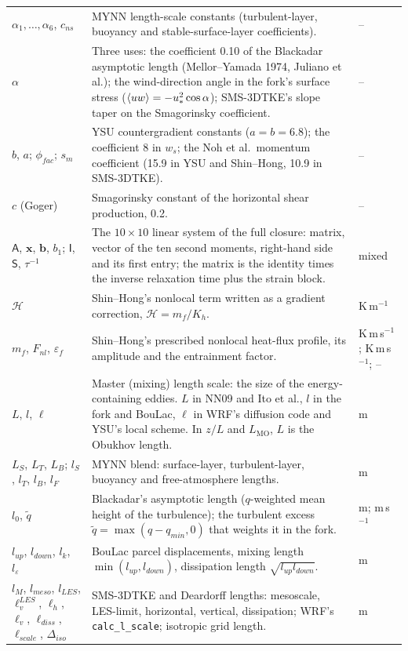 \begin{xltabular}{\linewidth}{@{}>{\raggedright\arraybackslash}p{3.6cm} >{\raggedright\arraybackslash}X >{\raggedright\arraybackslash}p{2.3cm}@{}}
$\alpha_1, \ldots, \alpha_6$, $c_{ns}$ & MYNN length-scale constants (turbulent-layer, buoyancy and stable-surface-layer coefficients). & -- \\
$\alpha$ & Three uses: the coefficient 0.10 of the Blackadar asymptotic length (Mellor--Yamada 1974, Juliano et al.); the wind-direction angle in the fork's surface stress ($\langle uw \rangle = -u_*^2\cos\alpha$); SMS-3DTKE's slope taper on the Smagorinsky coefficient. & -- \\
$b$, $a$; $\phi_{fac}$; $s_m$ & YSU countergradient constants ($a = b = 6.8$); the coefficient 8 in $w_s$; the Noh et al.\ momentum coefficient (15.9 in YSU and Shin--Hong, 10.9 in SMS-3DTKE). & -- \\
$c$ (Goger) & Smagorinsky constant of the horizontal shear production, 0.2. & -- \\
$\mathsf{A}$, $\mathbf{x}$, $\mathbf{b}$, $b_1$; $\mathsf{I}$, $\mathsf{S}$, $\tau^{-1}$ & The $10 \times 10$ linear system of the full closure: matrix, vector of the ten second moments, right-hand side and its first entry; the matrix is the identity times the inverse relaxation time plus the strain block. & mixed \\
$\mathcal{H}$ & Shin--Hong's nonlocal term written as a gradient correction, $\mathcal{H} = m_f/K_h$. & K\,m$^{-1}$ \\
$m_f$, $F_{nl}$, $\varepsilon_f$ & Shin--Hong's prescribed nonlocal heat-flux profile, its amplitude and the entrainment factor. & K\,m\,s$^{-1}$; K\,m\,s$^{-1}$; -- \\
$L$, $l$, $\ell$ & Master (mixing) length scale: the size of the energy-containing eddies. $L$ in NN09 and Ito et al., $l$ in the fork and BouLac, $\ell$ in WRF's diffusion code and YSU's local scheme. In $z/L$ and $L_{\mathrm{MO}}$, $L$ is the Obukhov length. & m \\
$L_S$, $L_T$, $L_B$; $l_S$, $l_T$, $l_B$, $l_F$ & MYNN blend: surface-layer, turbulent-layer, buoyancy and free-atmosphere lengths. & m \\
$l_0$, $\tilde q$ & Blackadar's asymptotic length ($q$-weighted mean height of the turbulence); the turbulent excess $\tilde q = \max(q - q_{min}, 0)$ that weights it in the fork. & m; m\,s$^{-1}$ \\
$l_{up}$, $l_{down}$, $l_k$, $l_\varepsilon$ & BouLac parcel displacements, mixing length $\min(l_{up}, l_{down})$, dissipation length $\sqrt{l_{up}l_{down}}$. & m \\
$l_M$, $l_{meso}$, $l_{LES}$, $\ell_v^{LES}$, $\ell_h$, $\ell_v$, $\ell_{diss}$, $\ell_{scale}$, $\Delta_{iso}$ & SMS-3DTKE and Deardorff lengths: mesoscale, LES-limit, horizontal, vertical, dissipation; WRF's \texttt{calc\_l\_scale}; isotropic grid length. & m \\

\end{xltabular}
